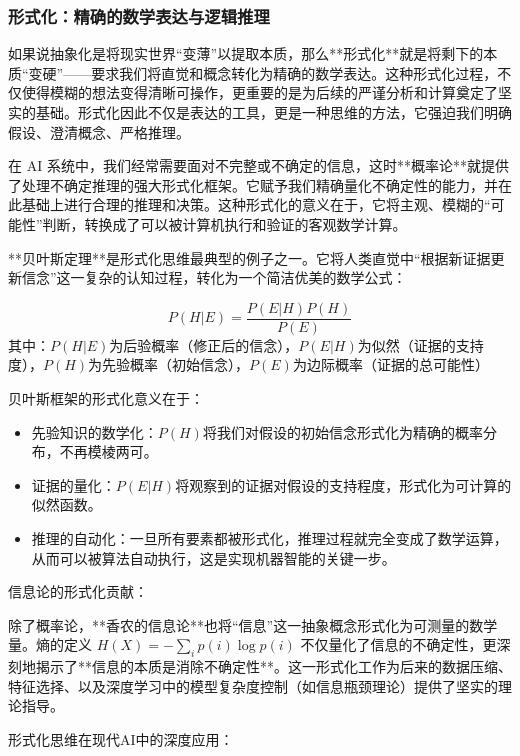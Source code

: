 \subsubsection{形式化：精确的数学表达与逻辑推理}

如果说抽象化是将现实世界“变薄”以提取本质，那么**形式化**就是将剩下的本质“变硬”——要求我们将直觉和概念转化为精确的数学表达。这种形式化过程，不仅使得模糊的想法变得清晰可操作，更重要的是为后续的严谨分析和计算奠定了坚实的基础。形式化因此不仅是表达的工具，更是一种思维的方法，它强迫我们明确假设、澄清概念、严格推理。

在 AI 系统中，我们经常需要面对不完整或不确定的信息，这时**概率论**就提供了处理不确定推理的强大形式化框架。它赋予我们精确量化不确定性的能力，并在此基础上进行合理的推理和决策。这种形式化的意义在于，它将主观、模糊的“可能性”判断，转换成了可以被计算机执行和验证的客观数学计算。

**贝叶斯定理**是形式化思维最典型的例子之一。它将人类直觉中“根据新证据更新信念”这一复杂的认知过程，转化为一个简洁优美的数学公式：

\begin{tcolorbox}[colback=green!5!white,colframe=green!75!black,title=核心定理：贝叶斯定理]
$$P(H|E) = \frac{P(E|H)P(H)}{P(E)}$$
其中：$P(H|E)$为后验概率（修正后的信念），$P(E|H)$为似然（证据的支持度），$P(H)$为先验概率（初始信念），$P(E)$为边际概率（证据的总可能性）
\end{tcolorbox}

贝叶斯框架的形式化意义在于：

\begin{itemize}
\item 先验知识的数学化：$P(H)$将我们对假设的初始信念形式化为精确的概率分布，不再模棱两可。
\item 证据的量化：$P(E|H)$将观察到的证据对假设的支持程度，形式化为可计算的似然函数。
\item 推理的自动化：一旦所有要素都被形式化，推理过程就完全变成了数学运算，从而可以被算法自动执行，这是实现机器智能的关键一步。
\end{itemize}

信息论的形式化贡献：

除了概率论，**香农的信息论**也将“信息”这一抽象概念形式化为可测量的数学量。熵的定义 $H(X) = -\sum_{i} p(i) \log p(i)$ 不仅量化了信息的不确定性，更深刻地揭示了**信息的本质是消除不确定性**。这一形式化工作为后来的数据压缩、特征选择、以及深度学习中的模型复杂度控制（如信息瓶颈理论）提供了坚实的理论指导。

形式化思维在现代AI中的深度应用：

